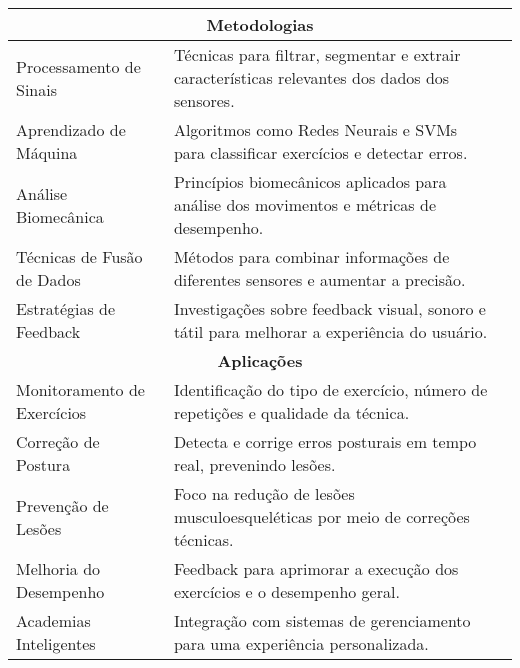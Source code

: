 \documentclass[a4paper,12pt]{article}
\begin{document}
\begin{longtable}{|p{3cm}|p{6cm}|p{3.4cm}|}
    \multicolumn{3}{|c|}{\textbf{Metodologias}} \\ \hline
    Processamento de Sinais & Técnicas para filtrar, segmentar e extrair características relevantes dos dados dos sensores. & \cite{Johnson2021, Tian2021, Asghar2023, MallolRagolta2021, Qi2019, Qi2020, Hussain2024} \\ \hline
    Aprendizado de Máquina & Algoritmos como Redes Neurais e SVMs para classificar exercícios e detectar erros. & \cite{Tian2021, papadopoulou2023towards, Asghar2023, Qi2019, Qi2020, Gleadhill2019, MallolRagolta2021, Hussain2024, Kwon2021, Hussain2022} \\ \hline
    Análise Biomecânica & Princípios biomecânicos aplicados para análise dos movimentos e métricas de desempenho. & \cite{Johnson2021, papadopoulou2023towards, Gleadhill2019, Moller2012, Sharshar2023, Michaud2021} \\ \hline
    Técnicas de Fusão de Dados & Métodos para combinar informações de diferentes sensores e aumentar a precisão. & \cite{Tian2021, MallolRagolta2021, Moller2012, Das2017} \\ \hline
    Estratégias de Feedback & Investigações sobre feedback visual, sonoro e tátil para melhorar a experiência do usuário. & \cite{papadopoulou2023towards, Zou2020, Krauter2024, Moller2012} \\ \hline

    \multicolumn{3}{|c|}{\textbf{Aplicações}} \\ \hline
    Monitoramento de Exercícios & Identificação do tipo de exercício, número de repetições e qualidade da técnica. & \cite{Tian2021, Asghar2023, Qi2019, Hussain2024} \\ \hline
    Correção de Postura & Detecta e corrige erros posturais em tempo real, prevenindo lesões. & \cite{papadopoulou2023towards, Zou2020, Krauter2024, Moller2012} \\ \hline
    Prevenção de Lesões & Foco na redução de lesões musculoesqueléticas por meio de correções técnicas. & \cite{Michaud2021, Islam2021, Gleadhill2019} \\ \hline
    Melhoria do Desempenho & Feedback para aprimorar a execução dos exercícios e o desempenho geral. & \cite{Moller2012, Sharshar2023, Michaud2021, Krauter2024, Sharshar2022} \\ \hline
    Academias Inteligentes & Integração com sistemas de gerenciamento para uma experiência personalizada. & \cite{Tian2021, Zou2020} \\ \hline

\end{longtable}
\end{document}

